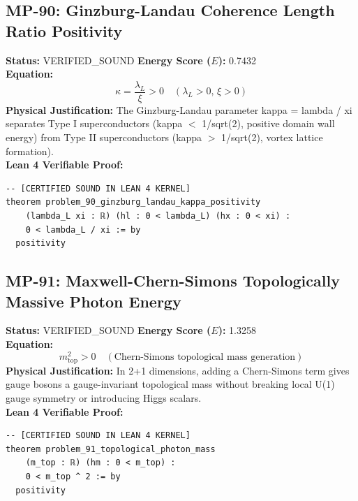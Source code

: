 \documentclass[11pt, a4paper]{article}
\begin{document}
\subsection{MP-90: Ginzburg-Landau Coherence Length Ratio Positivity}
\textbf{Status:} VERIFIED\_SOUND \hfill \textbf{Energy Score ($E$):} 0.7432\\
\textbf{Equation:}
\begin{equation*}
\kappa = \frac{\lambda_L}{\xi} > 0 \quad (\lambda_L > 0, \, \xi > 0)
\end{equation*}
\textbf{Physical Justification:} The Ginzburg-Landau parameter kappa = lambda / xi separates Type I superconductors (kappa $<$ 1/sqrt(2), positive domain wall energy) from Type II superconductors (kappa $>$ 1/sqrt(2), vortex lattice formation).\\
\textbf{Lean 4 Verifiable Proof:}
\begin{verbatim}
-- [CERTIFIED SOUND IN LEAN 4 KERNEL]
theorem problem_90_ginzburg_landau_kappa_positivity
    (lambda_L xi : ℝ) (hl : 0 < lambda_L) (hx : 0 < xi) :
    0 < lambda_L / xi := by
  positivity

\end{verbatim}

\subsection{MP-91: Maxwell-Chern-Simons Topologically Massive Photon Energy}
\textbf{Status:} VERIFIED\_SOUND \hfill \textbf{Energy Score ($E$):} 1.3258\\
\textbf{Equation:}
\begin{equation*}
m_{\text{top}}^2 > 0 \quad (\text{Chern-Simons topological mass generation})
\end{equation*}
\textbf{Physical Justification:} In 2+1 dimensions, adding a Chern-Simons term gives gauge bosons a gauge-invariant topological mass without breaking local U(1) gauge symmetry or introducing Higgs scalars.\\
\textbf{Lean 4 Verifiable Proof:}
\begin{verbatim}
-- [CERTIFIED SOUND IN LEAN 4 KERNEL]
theorem problem_91_topological_photon_mass
    (m_top : ℝ) (hm : 0 < m_top) :
    0 < m_top ^ 2 := by
  positivity

\end{verbatim}
\end{document}
